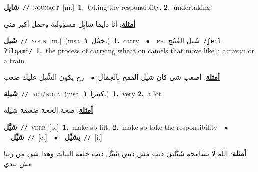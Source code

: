 \documentclass[10pt,a4paper,twoside]{article} %
\begin{document}
\begin{multicols}{2}
{\setlength\topsep{0pt}\textbf{\foreignlanguage{arabic}{شَايِل}}\ {\color{gray}\texttt{//}\color{black}}\ \textsc{noun\textunderscore act}\ [m.]\ \textbf{1.}~taking the responsibiity.  \textbf{2.}~undertaking\  \begin{flushright}\color{gray}\foreignlanguage{arabic}{\textbf{\underline{\foreignlanguage{arabic}{أمثلة}}}: أنا دايما شايِل مسؤولية وحمل أكبر مني}\end{flushright}\color{black}} \vspace{2mm}

{\setlength\topsep{0pt}\textbf{\foreignlanguage{arabic}{شَيل}}\ {\color{gray}\texttt{//}\color{black}}\ \textsc{noun}\ [m.]\ \color{gray}(msa. \foreignlanguage{arabic}{حَمْل}~\foreignlanguage{arabic}{\textbf{١.}})\color{black}\ \textbf{1.}~carry\ \ $\bullet$\ \ \textsc{ph.} \color{gray} \foreignlanguage{arabic}{شَيل القَمْح}\color{black}\ {\color{gray}\texttt{/{\sffamily ʃeːl ʔilqamħ}/}\color{black}}\ \textbf{1.}~the process of carrying wheat on camels that move like a caravan or a train\  \begin{flushright}\color{gray}\foreignlanguage{arabic}{\textbf{\underline{\foreignlanguage{arabic}{أمثلة}}}: أصعب شي كان شيل القمح بالجمال\ $\bullet$\ \  رح يكون الشِّيل عليك صعب}\end{flushright}\color{black}} \vspace{2mm}

{\setlength\topsep{0pt}\textbf{\foreignlanguage{arabic}{شَيلِة}}\ {\color{gray}\texttt{//}\color{black}}\ \textsc{adj/noun}\ \color{gray}(msa. \foreignlanguage{arabic}{كثيرا}~\foreignlanguage{arabic}{\textbf{١.}})\color{black}\ \textbf{1.}~very  \textbf{2.}~a lot\  \begin{flushright}\color{gray}\foreignlanguage{arabic}{\textbf{\underline{\foreignlanguage{arabic}{أمثلة}}}: صحة الحجة ضعيفة شِيلِة}\end{flushright}\color{black}} \vspace{2mm}

{\setlength\topsep{0pt}\textbf{\foreignlanguage{arabic}{شَيَّل}}\ {\color{gray}\texttt{//}\color{black}}\ \textsc{verb}\ [p.]\ \textbf{1.}~make sb lift.  \textbf{2.}~make sb take the responsibility\ \ $\bullet$\ \ \setlength\topsep{0pt}\textbf{\foreignlanguage{arabic}{شَيِّل}}\ {\color{gray}\texttt{//}\color{black}}\ [c.]\ \ $\bullet$\ \ \setlength\topsep{0pt}\textbf{\foreignlanguage{arabic}{يشَيِّل}}\ {\color{gray}\texttt{//}\color{black}}\ [i.]\  \begin{flushright}\color{gray}\foreignlanguage{arabic}{\textbf{\underline{\foreignlanguage{arabic}{أمثلة}}}: الله لا يسامحه شَيَّلني ذنب مش ذنبي شَيَّل ذنب خلفة البنات وهذا شي من ربنا مش بيدي}\end{flushright}\color{black}} \vspace{2mm}


\end{multicols}
\end{document}
